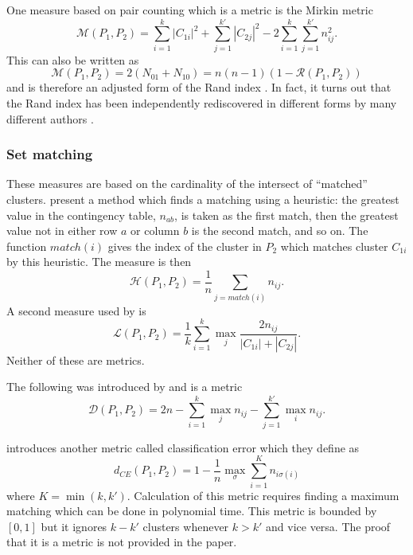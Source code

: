 \documentclass[a4paper]{report}
\begin{document}
One measure based on pair counting which is a metric is the Mirkin metric
\citep{mirkin-1996}
\begin{equation*}
  \mathcal{M}(P_1,P_2) = \sum_{i=1}^{k} |C_{1i}|^2 + \sum_{j=1}^{k'} |C_{2j}|^2
  - 2 \sum_{i=1}^{k} \sum_{j=1}^{k'} n_{ij}^2.
\end{equation*}
This can also be written as
\begin{equation*}
  \mathcal{M}(P_1,P_2) = 2(N_{01} + N_{10}) = n(n-1)(1-\mathcal{R}(P_1,P_2))
\end{equation*}
and is therefore an adjusted form of the Rand index \citep{meila-2007}.  In
fact, it turns out that the Rand index has been independently rediscovered in
different forms by many different authors \citep{hubert-arabie-1985}.

\subsubsection{Set matching}
\label{sec:set-matching}

These measures are based on the cardinality of the intersect of ``matched''
clusters.  \citet{meila-2001} present a method which finds a matching using a
heuristic: the greatest value in the contingency table, $n_{ab}$, is taken as
the first match, then the greatest value not in either row $a$ or column $b$
is the second match, and so on.  The function $match(i)$ gives the index of
the cluster in $P_2$ which matches cluster $C_{1i}$ by this heuristic.  The
measure is then
\begin{equation*}
  \mathcal{H}(P_1,P_2) = \frac{1}{n} \sum_{j=match(i)} n_{ij}.
\end{equation*}
A second measure used by \citet{larsen-aone-1999} is
\begin{equation*}
  \mathcal{L}(P_1,P_2) = \frac{1}{k} \sum_{i=1}^{k} \max_{j}
  \frac{2n_{ij}}{|C_{1i}|+|C_{2j}|}.
\end{equation*}
Neither of these are metrics.

The following was introduced by \citet{van-dongen-2000} and is a metric
\begin{equation*}
  \mathcal{D}(P_1,P_2) = 2n - \sum_{i=1}^{k} \max_{j} n_{ij} - \sum_{j=1}^{k'}
  \max_{i} n_{ij}.
\end{equation*}

\citet{meila-2005} introduces another metric called classification error which
they define as
\begin{equation*}
  d_{CE}(P_1,P_2) = 1 - \frac{1}{n} \max_{\sigma} \sum_{i=1}^{K} n_{i\sigma(i)}
\end{equation*}
where $K = \min(k,k')$.  Calculation of this metric requires finding a maximum
matching which can be done in polynomial time.  This metric is bounded by
$[0,1]$ but it ignores $k-k'$ clusters whenever $k>k'$ and vice versa.  The
proof that it is a metric is not provided in the paper.
\end{document}

